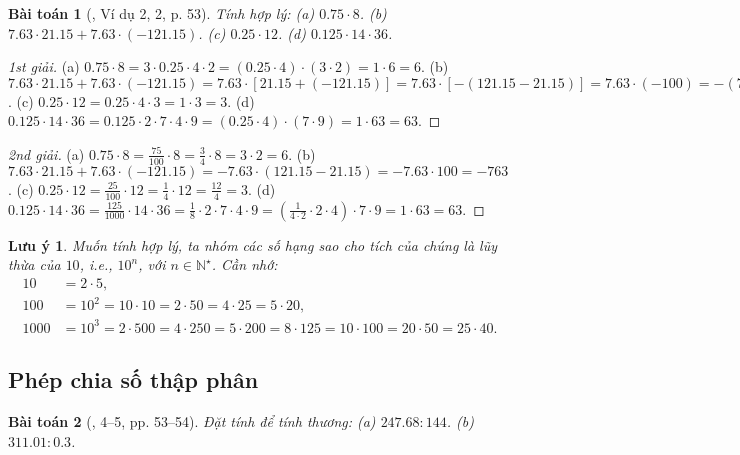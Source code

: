 \documentclass{article}
\newtheorem{baitoan}{Bài toán}
\newtheorem{luuy}{Lưu ý}
\begin{document}
\begin{baitoan}[\cite{SGK_Toan_6_Canh_Dieu_tap_2}, Ví dụ 2, 2, p. 53]
	Tính hợp lý: (a) $0.75\cdot8$. (b) $7.63\cdot21.15 + 7.63\cdot(-121.15)$. (c) $0.25\cdot12$. (d) $0.125\cdot14\cdot36$.
\end{baitoan}

\begin{proof}[1st giải]
	(a) $0.75\cdot8 = 3\cdot0.25\cdot4\cdot2 = (0.25\cdot4)\cdot(3\cdot2) = 1\cdot6 = 6$. (b) $7.63\cdot21.15 + 7.63\cdot(-121.15) = 7.63\cdot[21.15 + (-121.15)] = 7.63\cdot[-(121.15 - 21.15)] = 7.63\cdot(-100) = -(7.63\cdot100) = -763$. (c) $0.25\cdot12 = 0.25\cdot4\cdot3 = 1\cdot3 = 3$. (d) $0.125\cdot14\cdot36 = 0.125\cdot2\cdot7\cdot4\cdot9 = (0.25\cdot4)\cdot(7\cdot9) = 1\cdot63 = 63$.
\end{proof}

\begin{proof}[2nd giải]
	(a) $0.75\cdot8 = \frac{75}{100}\cdot8 = \frac{3}{4}\cdot8 = 3\cdot2 = 6$. (b) $7.63\cdot21.15 + 7.63\cdot(-121.15) = -7.63\cdot(121.15 - 21.15) = -7.63\cdot100 = -763$. (c) $0.25\cdot12 = \frac{25}{100}\cdot12 = \frac{1}{4}\cdot12 = \frac{12}{4} = 3$. (d) $0.125\cdot14\cdot36 = \frac{125}{1000}\cdot14\cdot36 = \frac{1}{8}\cdot2\cdot7\cdot4\cdot9 = \left(\frac{1}{4\cdot2}\cdot2\cdot4\right)\cdot7\cdot9 = 1\cdot63 = 63$.
\end{proof}

\begin{luuy}
	Muốn tính hợp lý, ta nhóm các số hạng sao cho tích của chúng là lũy thừa của $10$, i.e., $10^n$, với $n\in\mathbb{N}^\star$. Cần nhớ:
	\begin{align*}
		10 &= 2\cdot5,\\
		100 &= 10^2 = 10\cdot10 = 2\cdot50 = 4\cdot25 = 5\cdot20,\\
		1000 &= 10^3 = 2\cdot500 = 4\cdot250 = 5\cdot200 = 8\cdot125 = 10\cdot100 = 20\cdot50 = 25\cdot40.
	\end{align*}
\end{luuy}

\subsection{Phép chia số thập phân}

\begin{baitoan}[\cite{SGK_Toan_6_Canh_Dieu_tap_2}, 4--5, pp. 53--54]
	Đặt tính để tính thương: (a) $247.68:144$. (b) $311.01:0.3$.
\end{baitoan}
\end{document}
